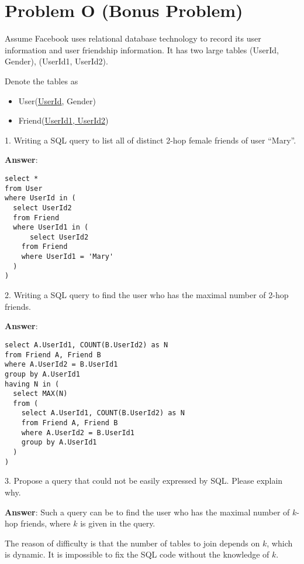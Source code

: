 \documentclass{article}
\begin{document}
\section{Problem O (Bonus Problem)}
Assume Facebook uses relational database technology to record its user information and user friendship information. It has two large tables (UserId, Gender), (UserId1, UserId2).

Denote the tables as
\begin{itemize}
\item User(\underline{UserId}, Gender)
\item Friend(\underline{UserId1, UserId2})
\end{itemize}

1. Writing a SQL query to list all of distinct 2-hop female friends of user ``Mary''.

{\bf Answer}:
\begin{verbatim}
select *
from User
where UserId in (
  select UserId2
  from Friend
  where UserId1 in (
	  select UserId2
    from Friend
    where UserId1 = 'Mary'
  )
)
\end{verbatim}

2. Writing a SQL query to find the user who has the maximal number of 2-hop friends.

{\bf Answer}:
\begin{verbatim}
select A.UserId1, COUNT(B.UserId2) as N
from Friend A, Friend B
where A.UserId2 = B.UserId1
group by A.UserId1
having N in (
  select MAX(N)
  from (
    select A.UserId1, COUNT(B.UserId2) as N
    from Friend A, Friend B
    where A.UserId2 = B.UserId1
    group by A.UserId1
  )
)
\end{verbatim}

3. Propose a query that could not be easily expressed by SQL. Please explain why.

{\bf Answer}:
Such a query can be to find the user who has the maximal number of $k$-hop friends, where $k$ is given in the query.

The reason of difficulty is that the number of tables to join depends on $k$, which is dynamic. It is impossible to fix the SQL code without the knowledge of $k$.
\end{document}
